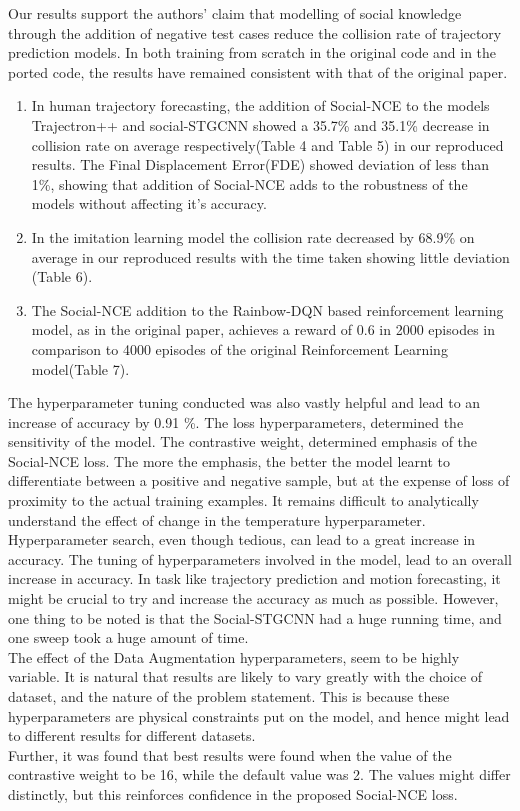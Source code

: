 Our results support the authors' claim that modelling of social knowledge through the addition of negative test cases reduce the collision rate of trajectory prediction models. In both training from scratch in the original code and in the ported code, the results have remained consistent with that of the original paper. 
\begin{enumerate}
  \item In human trajectory forecasting, the addition of Social-NCE to the models Trajectron++ and social-STGCNN showed a 35.7\% and 35.1\% decrease in collision rate on average respectively(Table 4 and Table 5) in our reproduced results. The Final Displacement Error(FDE) showed deviation of less than 1\%, showing that addition of Social-NCE adds to the robustness of the models without affecting it's accuracy.
  \item In the imitation learning model the collision rate decreased by 68.9\% on average in our reproduced results with the time taken showing little deviation (Table 6). 
  \item The Social-NCE addition to the Rainbow-DQN based reinforcement learning model, as in the original paper, achieves a reward of 0.6 in 2000 episodes in comparison to 4000 episodes of the original Reinforcement Learning model(Table 7).
\end{enumerate}
The hyperparameter tuning conducted was also vastly helpful and lead to an increase of accuracy by 0.91 \%. The loss hyperparameters, determined the sensitivity of the model. The contrastive weight, determined emphasis of the Social-NCE loss. The more the emphasis, the better the model learnt to differentiate between a positive and negative sample, but at the expense of loss of proximity to the actual training examples. It remains difficult to analytically understand the effect of change in the temperature hyperparameter.\\
Hyperparameter search, even though tedious, can lead to a great increase in accuracy. The tuning of hyperparameters involved in the model, lead to an overall increase in accuracy. In task like trajectory prediction and motion forecasting, it might be crucial to try and increase the accuracy as much as possible. However, one thing to be noted is that the Social-STGCNN had a huge running time, and one sweep took a huge amount of time.\\
The effect of the Data Augmentation hyperparameters, seem to be highly variable. It is natural that results are likely to vary greatly with the choice of dataset, and the nature of the problem statement. This is because these hyperparameters are physical constraints put on the model, and hence might lead to different results for different datasets.\\
Further, it was found that best results were found when the value of the contrastive weight to be 16, while the default value was 2. The values might differ distinctly, but this reinforces confidence in the proposed Social-NCE loss. 
